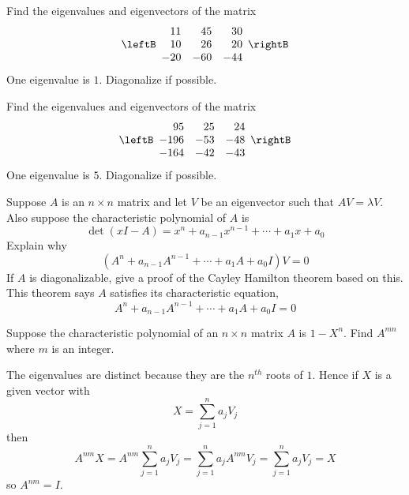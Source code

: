 \begin{enumialphparenastyle}
\begin{ex} Find the eigenvalues and eigenvectors of the matrix 
\begin{equation*}
\leftB
\begin{array}{rrr}
11 & 45 & 30 \\
10 & 26 & 20 \\
-20 & -60 & -44
\end{array}
\rightB
\end{equation*}
One eigenvalue is $1.$ Diagonalize if possible.
\end{ex}

\begin{ex} Find the eigenvalues and eigenvectors of the matrix  
\begin{equation*}
\leftB
\begin{array}{rrr}
95 & 25 & 24 \\
-196 & -53 & -48 \\
-164 & -42 & -43
\end{array}
\rightB
\end{equation*}
One eigenvalue is $5.$ Diagonalize if possible.
\end{ex}

\begin{ex} Suppose $A$ is an $n\times n$ matrix and let $V$ be an
eigenvector such that $AV=\lambda V$. Also suppose the
characteristic polynomial of $A$ is
\begin{equation*}
\det \left( x I-A\right) =x ^{n}+a_{n-1} x ^{n-1}+\cdots
+a_{1}x +a_{0}
\end{equation*}
Explain why
\begin{equation*}
\left( A^{n}+a_{n-1}A^{n-1}+\cdots +a_{1}A+a_{0}I\right) V=0
\end{equation*}
If $A$ is diagonalizable, give a proof of the Cayley Hamilton
theorem based on this. This theorem says $A$ satisfies its
characteristic equation,
\begin{equation*}
A^{n}+a_{n-1}A^{n-1}+\cdots +a_{1}A+a_{0}I=0
\end{equation*} 
\end{ex}

\begin{ex} Suppose the characteristic polynomial of an $n\times n$ matrix $A$ is 
$1-X ^{n}$. Find $A^{mn}$ where $m$ is an integer. 
\begin{sol}
The eigenvalues are distinct because
they are the $n^{th}$ roots of $1$. Hence if $X$ is a given vector with
\[
X=\sum_{j=1}^{n}a_{j}V_{j}
\]
then
\[
A^{nm}X=A^{nm}\sum_{j=1}^{n}a_{j}V_{j}=
\sum_{j=1}^{n}a_{j}A^{nm}V_{j}=\sum_{j=1}^{n}a_{j}V_{j}=X
\]
so $A^{nm}=I$.
\end{sol}
\end{ex}

\end{enumialphparenastyle}